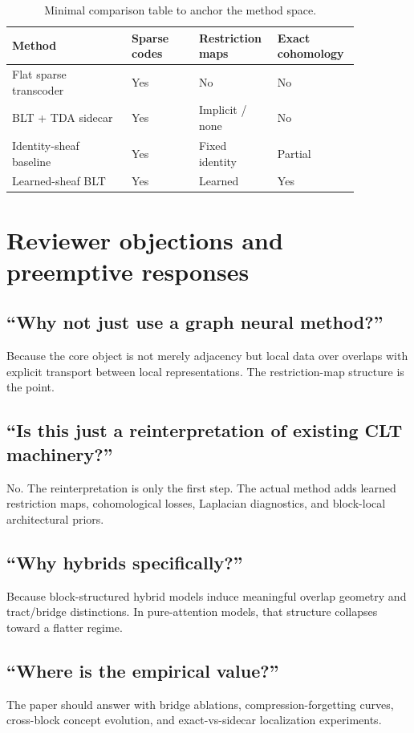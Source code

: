 \documentclass[11pt]{article}
\begin{document}
\begin{table}[H]
\centering
\begin{tabular}{>{\raggedright\arraybackslash}p{0.32\linewidth} p{0.18\linewidth} p{0.18\linewidth} p{0.18\linewidth}}
\toprule
\textbf{Method} & \textbf{Sparse codes} & \textbf{Restriction maps} & \textbf{Exact cohomology} \\
\midrule
Flat sparse transcoder & Yes & No & No \\
BLT + TDA sidecar & Yes & Implicit / none & No \\
Identity-sheaf baseline & Yes & Fixed identity & Partial \\
Learned-sheaf BLT & Yes & Learned & Yes \\
\bottomrule
\end{tabular}
\caption{Minimal comparison table to anchor the method space.}
\end{table}

\section{Reviewer objections and preemptive responses}

\subsection*{``Why not just use a graph neural method?''}
Because the core object is not merely adjacency but local data over overlaps with explicit transport between local representations. The restriction-map structure is the point.

\subsection*{``Is this just a reinterpretation of existing CLT machinery?''}
No. The reinterpretation is only the first step. The actual method adds learned restriction maps, cohomological losses, Laplacian diagnostics, and block-local architectural priors.

\subsection*{``Why hybrids specifically?''}
Because block-structured hybrid models induce meaningful overlap geometry and tract/bridge distinctions. In pure-attention models, that structure collapses toward a flatter regime.

\subsection*{``Where is the empirical value?''}
The paper should answer with bridge ablations, compression-forgetting curves, cross-block concept evolution, and exact-vs-sidecar localization experiments.
\end{document}

